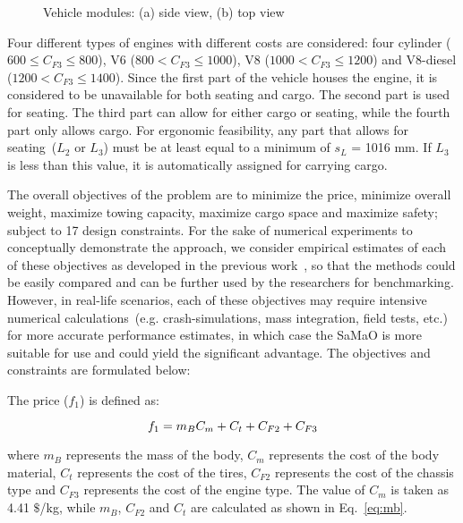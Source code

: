 \begin{figure}[!htb]
	\centering    
	\caption{Vehicle modules: (a) side view, (b) top view}
	\label{fig:car}
\end{figure}

Four different types of engines with different costs are considered: four cylinder ($600 \le C_{F3} \le 800$), V6 ($800 < C_{F3} \le 1000$), V8 ($1000 < C_{F3} \le 1200$) and V8-diesel ($1200 < C_{F3} \le 1400$). Since the first part of the vehicle houses the engine, it is considered to be unavailable for both seating and cargo. The second part {\color{blue} is used for seating.} The third part can allow for either cargo or seating, while the fourth part only allows cargo. For ergonomic feasibility, any part that allows for seating~($L_2$ or $L_3$) must be at least equal to a minimum of  $s_L$ = 1016 mm. If $L_3$ is less than this value, it is automatically assigned for carrying cargo. 

The overall objectives of the problem are to minimize the price, minimize overall weight, maximize towing capacity, maximize cargo space and maximize safety; subject to 17 design constraints. For the sake of numerical experiments to conceptually demonstrate the approach, we consider empirical estimates of each of these objectives as developed in the previous work~\cite{KHTbarnum2010car}, so that the methods could be easily compared and can be further used by the researchers for benchmarking. However, in real-life scenarios, each of these objectives may require intensive numerical calculations~(e.g. crash-simulations, mass integration, field tests, etc.) for more accurate performance estimates, in which case the SaMaO is more suitable for use and could yield the significant advantage. The objectives and constraints are formulated below:  

The price ($f_1$) is defined as:

\begin{equation}\footnotesize
f_1 = m_BC_m + C_t + C_{F2} + C_{F3}
\label{eq:f1}
\end{equation}

where $m_B$ represents the mass of the body, $C_m$ represents the cost of the body material, $C_t$ represents the cost of the tires, $C_{F2}$ represents the cost of the chassis type and $C_{F3}$ represents the cost of the engine type. The value of $C_m$ is taken as 4.41 $\$$/kg, while $m_B$, $C_{F2}$ and $C_t$ are calculated as shown in Eq.~\ref{eq:mb}.

